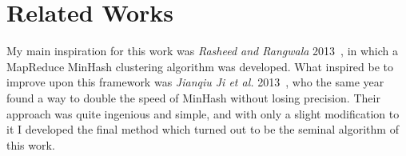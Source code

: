 \documentclass[../../main.tex]{subfiles}
\begin{document}
\section{Related Works}

My main inspiration for this work was \textit{Rasheed and Rangwala} 2013~\cite{MinhashMapreduce}, in which a MapReduce MinHash clustering algorithm was developed. What inspired be to improve upon this framework was \textit{Jianqiu Ji et al.} 2013~\cite{minmaxhash}, who the same year found a way to double the speed of MinHash without losing precision. Their approach was quite ingenious and simple, and with only a slight modification to it I developed the final method which turned out to be the seminal algorithm of this work.
\end{document}
